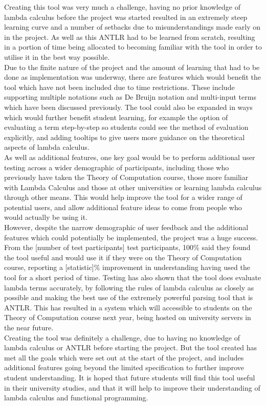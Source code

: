 \documentclass[a4paper,11pt]{report}
\begin{document}
Creating this tool was very much a challenge, having no prior knowledge of lambda calculus before the project was started resulted in an extremely steep learning curve and a number of setbacks due to misunderstandings made early on in the project. As well as this ANTLR had to be learned from scratch, resulting in a portion of time being allocated to becoming familiar with the tool in order to utilise it in the best way possible.\\

Due to the finite nature of the project and the amount of learning that had to be done as implementation was underway, there are features which would benefit the tool which have not been included due to time restrictions. These include supporting multiple notations such as De Bruijn notation and multi-input terms which have been discussed previously. The tool could also be expanded in ways which would further benefit student learning, for example the option of evaluating a term step-by-step so students could see the method of evaluation explicitly, and adding tooltips to give users more guidance on the theoretical aspects of lambda calculus.\\

As well as additional features, one key goal would be to perform additional user testing across a wider demographic of participants, including those who previously have taken the Theory of Computation course, those more familiar with Lambda Calculus and those at other universities or learning lambda calculus through other means. This would help improve the tool for a wider range of potential users, and allow additional feature ideas to come from people who would actually be using it.\\

However, despite the narrow demographic of user feedback and the additional features which could potentially be implemented, the project was a huge success. From the [number of test participants] test participants, 100\% said they found the tool useful and would use it if they were on the Theory of Computation course, reporting a [statistic]\% improvement in understanding having used the tool for a short period of time. Testing has also shown that the tool does evaluate lambda terms accurately, by following the rules of lambda calculus as closely as possible and making the best use of the extremely powerful parsing tool that is ANTLR. This has resulted in a system which will accessible to students on the Theory of Computation course next year, being hosted on university servers in the near future.\\

Creating the tool was definitely a challenge, due to having no knowledge of lambda calculus or ANTLR before starting the project. But the tool created has met all the goals which were set out at the start of the project, and includes additional features going beyond the limited specification to further improve student understanding. It is hoped that future students will find this tool useful in their university studies, and that it will help to improve their understanding of lambda calculus and functional programming.

\newpage
\printbibliography
\end{document}
